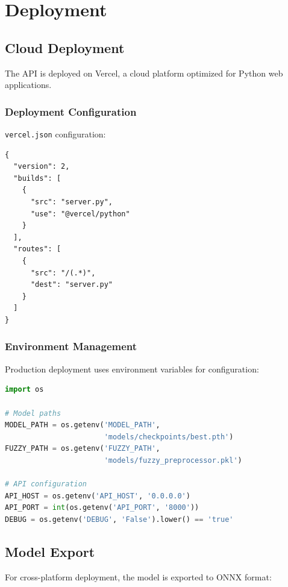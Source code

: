 \documentclass[12pt,a4paper]{report}
\begin{document}
\section{Deployment}

\subsection{Cloud Deployment}

The API is deployed on Vercel, a cloud platform optimized for Python web applications.

\subsubsection{Deployment Configuration}

\texttt{vercel.json} configuration:

\begin{lstlisting}[caption={Vercel Configuration}]
{
  "version": 2,
  "builds": [
    {
      "src": "server.py",
      "use": "@vercel/python"
    }
  ],
  "routes": [
    {
      "src": "/(.*)",
      "dest": "server.py"
    }
  ]
}
\end{lstlisting}

\subsubsection{Environment Management}

Production deployment uses environment variables for configuration:

\begin{lstlisting}[language=Python, caption={Environment Configuration}]
import os

# Model paths
MODEL_PATH = os.getenv('MODEL_PATH', 
                       'models/checkpoints/best.pth')
FUZZY_PATH = os.getenv('FUZZY_PATH', 
                       'models/fuzzy_preprocessor.pkl')

# API configuration
API_HOST = os.getenv('API_HOST', '0.0.0.0')
API_PORT = int(os.getenv('API_PORT', '8000'))
DEBUG = os.getenv('DEBUG', 'False').lower() == 'true'
\end{lstlisting}

\subsection{Model Export}

For cross-platform deployment, the model is exported to ONNX format:
\end{document}
